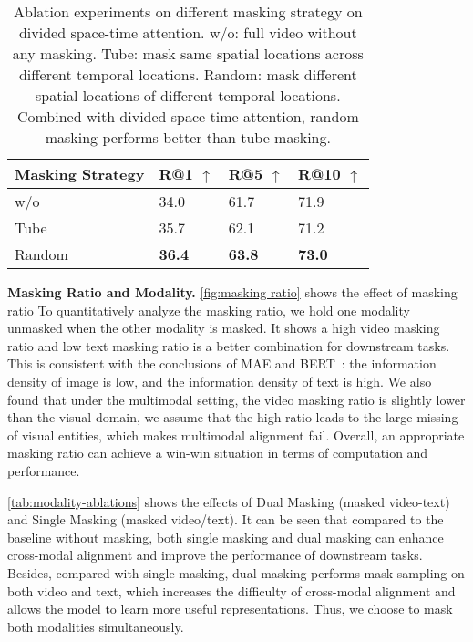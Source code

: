 \documentclass[10pt,twocolumn,letterpaper]{article}
\begin{document}
\begin{table}[h]
    \centering
    \small
    \begin{tabular}{@{}l|lll@{}}
    \toprule
    \textbf{Masking Strategy}  & \textbf{R@1} $\uparrow$  & \textbf{R@5} $\uparrow$   & \textbf{R@10}  $\uparrow$   \\ \midrule
    w/o    & 34.0 & 61.7 & 71.9 \\
    Tube  &   35.7     &  62.1      & 71.2       \\ 
    Random    &  \textbf{36.4}  &    \textbf{63.8}    &    \textbf{73.0}    \\ \bottomrule
    \end{tabular}
    \caption{Ablation experiments on different masking strategy on divided space-time attention. w/o: full video without any masking. Tube: mask same spatial locations across different temporal locations. Random: mask different spatial locations of different temporal locations. Combined with divided space-time attention, random masking performs better than tube masking.}
    \vspace{-2mm}
    \label{tab:maskingtype-ablations}
    \end{table}


\vspace{1mm}\noindent\textbf{Masking Ratio and Modality.} \cref{fig:masking ratio} shows the effect of masking ratio To quantitatively analyze the masking ratio, we hold one modality unmasked when the other modality is masked. It shows a high video masking ratio and low text masking ratio is a better combination for downstream tasks. This is consistent with the conclusions of MAE\cite{mae} and BERT~\cite{beit}: the information density of image is low, and the information density of text is high. We also found that under the multimodal setting, the video masking ratio is slightly lower than the visual domain, we assume that the high ratio leads to the large missing of visual entities, which makes multimodal alignment fail. Overall, an appropriate masking ratio can achieve a win-win situation in terms of computation and performance.

\cref{tab:modality-ablations} shows the effects of Dual Masking (masked video-text) and Single Masking (masked video/text). It can be seen that compared to the baseline without masking, both single masking and dual masking can enhance cross-modal alignment and improve the performance of downstream tasks. Besides, compared with single masking, dual masking performs mask sampling on both video and text, which increases the difficulty of cross-modal alignment and allows the model to learn more useful representations. Thus, we choose to mask both modalities simultaneously.
\end{document}
